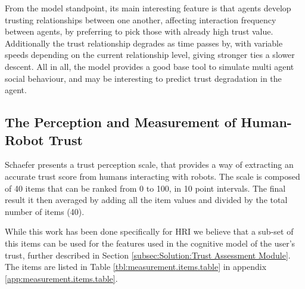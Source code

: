 From the model standpoint, its main interesting feature is that agents develop trusting relationships between one another, affecting interaction frequency between agents, by preferring to pick those with already high trust value. Additionally the trust relationship degrades as time passes by, with variable speeds depending on the current relationship level, giving stronger ties a slower descent. All in all, the model provides a good base tool to simulate multi agent social behaviour, and may be interesting to predict trust degradation in the agent.

\subsection{The Perception and Measurement of Human-Robot Trust}
\label{subsec:Related work:The Perception and Measurement of Human-Robot Trust}

Schaefer\cite{Schaefer2009} presents a trust perception scale, that provides a way of extracting an accurate trust score from humans interacting with robots. The scale is composed of 40 items that can be ranked from 0 to 100, in 10 point intervals. The final result it then averaged by adding all the item values and divided by the total number of items (40). 

While this work has been done specifically for \ac{HRI} we believe that a sub-set of this items can be used for the features used in the cognitive model of the user's trust, further described in Section \ref{subsec:Solution:Trust Assessment Module}. The items are listed in Table \ref{tbl:measurement.items.table} in appendix \ref{app:measurement.items.table}.





